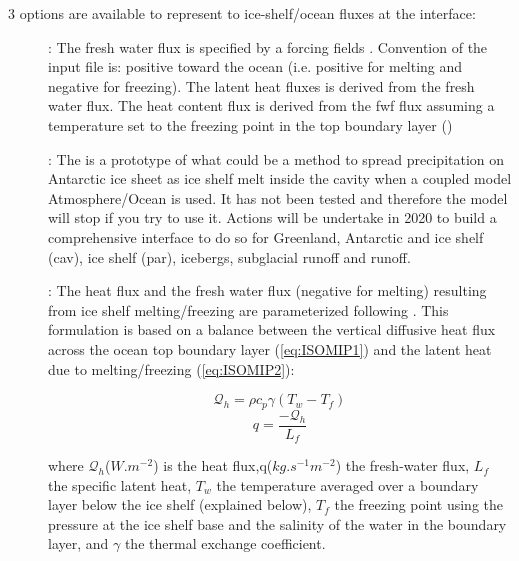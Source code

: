 \documentclass[../main/NEMO_manual]{subfiles}
\begin{document}
     3 options are available to represent to ice-shelf/ocean fluxes at the interface:
     \begin{description}
        \item[]:
        The fresh water flux is specified by a forcing fields . Convention of the input file is: positive toward the ocean (i.e. positive for melting and negative for freezing).
        The latent heat fluxes is derived from the fresh water flux. 
        The heat content flux is derived from the fwf flux assuming a temperature set to the freezing point in the top boundary layer ()

        \item[]:
        The  is a prototype of what could be a method to spread precipitation on Antarctic ice sheet as ice shelf melt inside the cavity when a coupled model Atmosphere/Ocean is used. 
        It has not been tested and therefore the model will stop if you try to use it. 
        Actions will be undertake in 2020 to build a comprehensive interface to do so for Greenland, Antarctic and ice shelf (cav), ice shelf (par), icebergs, subglacial runoff and runoff.

        \item[]:
        The heat flux and the fresh water flux (negative for melting) resulting from ice shelf melting/freezing are parameterized following \citet{Grosfeld1997}. 
        This formulation is based on a balance between the vertical diffusive heat flux across the ocean top boundary layer (\autoref{eq:ISOMIP1}) 
        and the latent heat due to melting/freezing (\autoref{eq:ISOMIP2}):

        \begin{equation}
        \label{eq:ISOMIP1}
        \mathcal{Q}_h = \rho c_p \gamma (T_w - T_f)
        \end{equation}
        \begin{equation}
        \label{eq:ISOMIP2}
        q = \frac{-\mathcal{Q}_h}{L_f}
        \end{equation}
        
        where $\mathcal{Q}_h$($W.m^{-2}$) is the heat flux,q($kg.s^{-1}m^{-2}$) the fresh-water flux, 
        $L_f$ the specific latent heat, $T_w$ the temperature averaged over a boundary layer below the ice shelf (explained below), 
        $T_f$ the freezing point using  the  pressure  at  the  ice  shelf  base  and  the  salinity  of the water in the boundary layer, 
        and $\gamma$ the thermal exchange coefficient.


\end{description}
\end{document}
